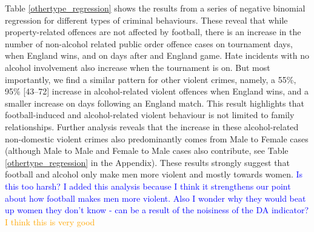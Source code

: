 \documentclass[12pt, letterpaper]{article}
\newcommand{\TM}[1] {{\textcolor{orange}{#1}}}
\newcommand{\AT}[1] {{\textcolor{blue}{#1}}}
\begin{document}
Table \ref{othertype_regression} shows the results from a series of negative binomial regression for different types of criminal behaviours. These reveal that while property-related offences are not affected by football, there is an increase in the number of non-alcohol related public order offence cases on tournament days, when England wins, and on days after and England game. Hate incidents with no alcohol involvement also increase when the tournament is on. But most importantly, we find a similar pattern for other violent crimes, namely, a 55\%, 95\% [43--72] increase in alcohol-related violent offences when England wins, and a smaller increase on days following an England match. This result highlights that football-induced and alcohol-related violent behaviour is not limited to family relationships. Further analysis reveals that the increase in these alcohol-related non-domestic violent crimes also predominantly comes from Male to Female cases (although Male to Male and Female to Male cases also contribute, see Table \ref{othertype_regression} in the Appendix). These results strongly suggest that football and alcohol only make men more violent and mostly towards women. \AT{Is this too harsh? I added this analysis because I think it strengthens our point about how football makes men more violent. Also I wonder why they would beat up women they don't know - can be a result of the noisiness of the DA indicator?} \TM{I think this is very good}
\end{document}
